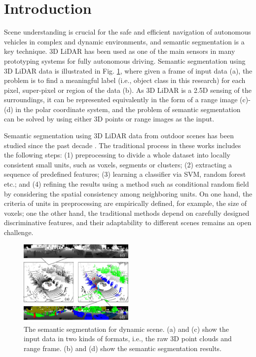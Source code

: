 \section{Introduction}
	Scene understanding is crucial for the safe and efficient navigation of autonomous vehicles in complex and dynamic environments, and semantic segmentation is a key technique. 3D LiDAR has been used as one of the main sensors in many prototyping systems for fully autonomous driving\cite{urmson2008autonomous}. Semantic segmentation using 3D LiDAR data is illustrated in Fig. \ref{fig:dynamiccampus}, where given a frame of input data (a), the problem is to find a meaningful label (i.e., object class in this research) for each pixel, super-pixel or region of the data (b). As 3D LiDAR is a 2.5D sensing of the surroundings, it can be represented equivalently in the form of a range image (c)-(d) in the polar coordinate system, and the problem of semantic segmentation can be solved by using either 3D points or range images as the input.
	
	Semantic segmentation using 3D LiDAR data from outdoor scenes has been studied since the past decade \cite{urmson2008autonomous,moosmann2009segmentation,douillard2011segmentation}. The traditional process in these works \cite{munoz2009onboard,zhao2010scene} includes the following steps: (1) preprocessing to divide a whole dataset into locally consistent small units, such as voxels, segments or clusters; (2) extracting a sequence of predefined features; (3) learning a classifier via SVM, random forest etc.; and (4) refining the results using a method such as conditional random field by considering the spatial consistency among neighboring units. On one hand, the criteria of units in preprocessing are empirically defined, for example, the size of voxels\cite{hackel2017isprs}; one the other hand, the traditional methods depend on carefully designed discriminative features, and their adaptability to different scenes remains an open challenge.
	
	\begin{figure}
		\centering
		\includegraphics[width=0.5\textwidth]{fig/Fig1.png}
		\caption{The semantic segmentation for dynamic scene. (a) and (c) show the input data in two kinds of formats, i.e., the raw 3D point clouds and range frame. (b) and (d) show the semantic segmentation results.}
		\label{fig:dynamiccampus}
	\end{figure}	
	
